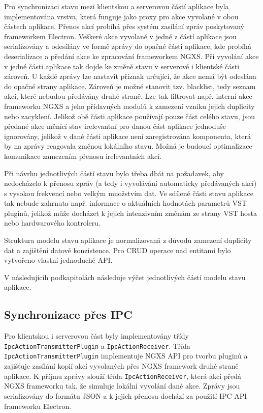 \documentclass[thesis=M,czech]{FITthesis}[2019/03/06]
\begin{document}
		Pro synchronizaci stavu mezi klientskou a serverovou částí aplikace byla implementována vrstva, která funguje jako proxy
		pro akce vyvolané v obou částech aplikace. Přenos akcí probíhá přes systém zasílání zpráv poskytovaný frameworkem Electron.
		Veškeré akce vyvolané v jedné z částí aplikace jsou serializovány a odesílány ve formě zprávy do opačné části aplikace, kde
		probíhá deserializace a předání akce ke zpracování frameworkem NGXS. Při vyvolání akce v jedné části aplikace tak dojde
		ke změně stavu v serverové i klientské části zároveň. U každé zprávy lze nastavit příznak určující, že akce nemá být odeslána
		do opačné strany aplikace. Zároveň je možné stanovit tzv. blacklist, tedy seznam akcí, které nebudou předávány druhé straně.
		Lze tak filtrovat např. interní akce frameworku NGXS a jeho přídavných modulů k zamezení vzniku jejich duplicity nebo zacyklení.
		Jelikož obě části aplikace používají pouze část celého stavu, jsou předané akce měnící stav irelevantní pro danou část aplikace  jednoduše ignorovány, jelikož v dané části aplikace není zaregistrována komponenta, která by na zprávy reagovala změnou lokálního stavu.
		Možná je budoucí optimalizace komunikace zamezením přenosu irelevantních akcí.
		
		Při návrhu jednotlivých částí stavu bylo třeba dbát na požadavek, aby nedocházelo k přenosu zpráv (a tedy i vyvolávání automaticky předávaných akcí) s vysokou frekvencí nebo velkým množstvím dat. Ve sdílené části stavu aplikace tak nebude zahrnuta např. informace o aktuálních hodnotách parametrů VST pluginů, jelikož může docházet k jejich intenzivním změnám ze strany VST hosta nebo hardwarového kontroleru.
		
		Struktura modelu stavu aplikace je normalizovaná z důvodu zamezení duplicity dat a zajištění datové konzistence\cite{state-normalization}. Pro CRUD operace nad
		entitami bylo vytvořeno vlastní jednoduché API.
		
		V následujícíh podkapitolách následuje výčet jednotlivých
		částí modelu stavu aplikace.
		
		\subsection{Synchronizace přes IPC}
			Pro klientskou i serverovou část byly implementovány třídy \texttt{IpcActionTransmitterPlugin} a 
			\texttt{IpcActionReceiver}. Třída \texttt{IpcActionTransmitterPlugin} implementuje NGXS API pro tvorbu pluginů a zajišťuje zasílání kopií  akcí vyvolaných přes NGXS framework	druhé straně aplikace. K příjmu zprávy slouží třída \texttt{IpcActionReceiver}, která akci předá
			NGXS frameworku tak, že simuluje lokální vyvolání dané akce. Zprávy jsou serializovány do formátu JSON a k jejich přenosu dochází
			za použití IPC API frameworku Electron.
		
\end{document}
